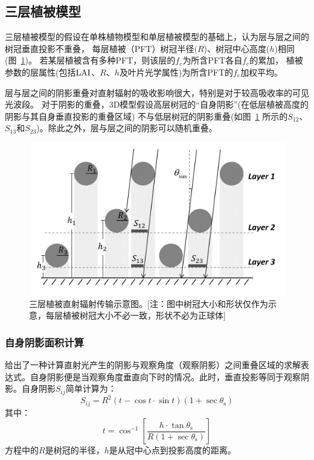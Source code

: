 \subsection{三层植被模型}
三层植被模型的假设在单株植物模型和单层植被模型的基础上，认为层与层之间的树冠垂直投影不重叠，
每层植被（PFT）树冠半径$(R$)、树冠中心高度($h$)相同(图~\ref{fig:三层植被结构示意图})。
若某层植被含有多种PFT，则该层的$f_{\mathrm {c}}$为所含PFT各自$f_{\mathrm {c}}$的累加，
植被参数的层属性(包括${\rm LAI}$、$R$、$h$及叶片光学属性)为所含PFT的$f_{\mathrm {c}}$加权平均。

层与层之间的阴影重叠对直射辐射的吸收影响很大，特别是对于较高吸收率的可见光波段。
对于阴影的重叠，3D模型假设高层树冠的“自身阴影”(在低层植被高度的阴影与其自身垂直投影的重叠区域)
不与低层树冠的阴影重叠(如图~\ref{fig:三层植被结构示意图} 所示的$S_{12}$、$S_{13}$和$S_{23}$)。除此之外，层与层之间的阴影可以随机重叠。%
{
  \begin{figure}[htbp]
    \centering
    \includegraphics[width=0.8\columnwidth]{Figures/辐射过程及辐射通量计算/三层植被结构示意图.png}
    \caption[三层植被直射辐射传输示意图]{三层植被直射辐射传输示意图。[注：图中树冠大小和形状仅作为示意，每层植被树冠大小不必一致，形状不必为正球体]}
    \label{fig:三层植被结构示意图}
  \end{figure}
}

\subsubsection{自身阴影面积计算}

\citet{li1992GeometricopticalBidirectionalReflectance}给出了一种计算直射光产生的阴影与观察角度（观察阴影）之间重叠区域的求解表达式。自身阴影便是当观察角度垂直向下时的情况。此时，垂直投影等同于观察阴影。自身阴影$S_{ij}$简单计算为：
%
\begin{equation}
  S_{ij} = R^{2}\left( t - \cos t \cdot \sin t \right)\left( 1 + \sec\theta_{\mathrm{s}} \right)
\end{equation}
其中：
%
\begin{equation}
  t = \cos^{- 1}\left\lbrack \frac{h \cdot \tan\theta_{\mathrm{s}}}{R\left( 1 + \sec\theta_{\mathrm{s}} \right)} \right\rbrack
\end{equation}
%
方程中的\(R\)是树冠的半径，\(h\)是从冠中心点到投影高度的距离。

